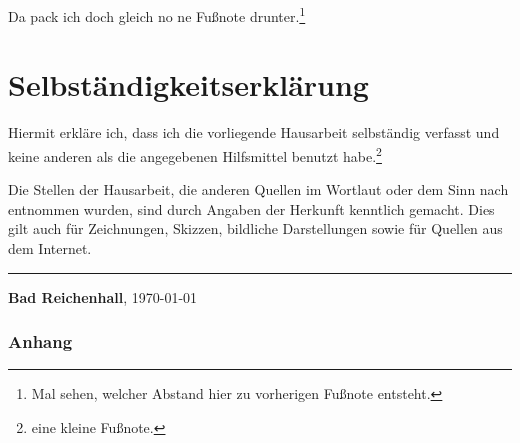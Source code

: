 \documentclass[a4paper,12pt,oneside,pointlessnumbers]{scrartcl}
\begin{document}
Da pack ich doch gleich no ne Fußnote drunter.\footnote{Mal sehen, welcher Abstand hier zu vorherigen Fußnote entsteht.}

\lipsum[10]



\lipsum[41]


\newpage
\part{Selbständigkeitserklärung}
Hiermit erkläre ich, dass ich die vorliegende Hausarbeit selbständig verfasst und keine anderen als die angegebenen Hilfsmittel benutzt habe.\footnote{eine kleine Fußnote.}

Die Stellen der Hausarbeit, die anderen Quellen im Wortlaut oder dem Sinn nach entnommen wurden, sind durch Angaben der Herkunft kenntlich gemacht. Dies gilt auch für Zeichnungen, Skizzen, bildliche Darstellungen sowie für Quellen aus dem Internet.

\vspace{20mm}
\hrule
\vspace{5mm}
\begin{center}
\textbf{Bad Reichenhall}, \today
\end{center}


\newpage
\listoffigures		%

\newpage
\listoftables		%

\newpage
{}
\small 						%


\newpage
\appendix
{}
\begin{appendix}
\section*{Anhang}
\end{appendix}
\end{document}
